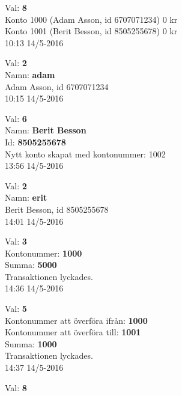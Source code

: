 \begin{multicols}{2}
\begin{exampleblock}
Val: \textbf{8}\\
Konto 1000 (Adam Asson, id 6707071234) 0 kr\\
Konto 1001 (Berit Besson, id 8505255678) 0 kr\\
10:13 14/5-2016\\
\end{exampleblock}
\begin{exampleblock}
Val: \textbf{2}\\
Namn: \textbf{adam}\\
Adam Asson, id 6707071234\\
10:15 14/5-2016\\
\end{exampleblock}
\begin{exampleblock}
Val: \textbf{6}\\
Namn: \textbf{Berit Besson}\\
Id: \textbf{8505255678}\\
Nytt konto skapat med kontonummer: 1002\\
13:56 14/5-2016\\
\end{exampleblock}
\begin{exampleblock}
Val: \textbf{2}\\
Namn: \textbf{erit}\\
Berit Besson, id 8505255678\\
14:01 14/5-2016\\
\end{exampleblock}
\begin{exampleblock}
Val: \textbf{3}\\
Kontonummer: \textbf{1000}\\
Summa: \textbf{5000}\\
Transaktionen lyckades.\\
14:36 14/5-2016\\
\end{exampleblock}
\begin{exampleblock}
Val: \textbf{5}\\
Kontonummer att överföra ifrån: \textbf{1000}\\
Kontonummer att överföra till: \textbf{1001}\\
Summa: \textbf{1000}\\
Transaktionen lyckades.\\
14:37 14/5-2016\\
\end{exampleblock}
\begin{exampleblock}
Val: \textbf{8}\\

\end{exampleblock}
\end{multicols}
